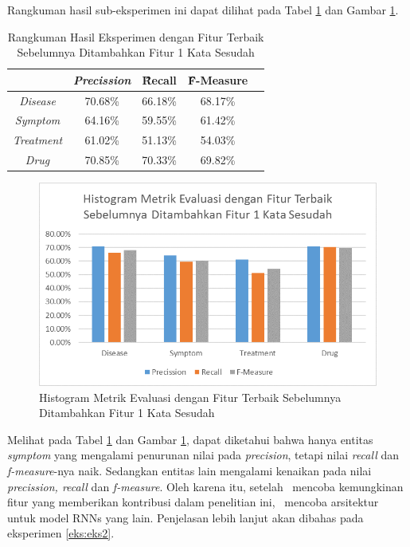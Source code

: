 	Rangkuman hasil sub-eksperimen ini dapat dilihat pada Tabel \ref{table:owndict8} dan Gambar \ref{fig:owndict8}.
	
	\begin{table}
		\centering
		\caption{Rangkuman Hasil Eksperimen dengan Fitur Terbaik Sebelumnya Ditambahkan Fitur 1 Kata Sesudah}
		\begin{tabular}{|c|c|c|c|c|}
			\hline
			& \textit{Precission} & \f{\f{Recall}} & \f{\f{F-Measure}} \\ \hline
			\textit{Disease}      & 70.68\%             & 66.18\%        & 68.17\%           \\ \hline
			\textit{Symptom}      & 64.16\%             & 59.55\%        & 61.42\%           \\ \hline
			\textit{Treatment}    & 61.02\%             & 51.13\%        & 54.03\%           \\ \hline
			\textit{Drug}		  & 70.85\%             & 70.33\%        & 69.82\%           \\ \hline
		\end{tabular}
		\label{table:owndict8}
	\end{table}
	
	\begin{figure}
		\centering
		\includegraphics[width=0.85\linewidth]{images/histogram8}
		\caption{Histogram Metrik Evaluasi dengan Fitur Terbaik Sebelumnya Ditambahkan Fitur 1 Kata Sesudah}
		\label{fig:owndict8}
	\end{figure}
	
	Melihat pada Tabel \ref{table:owndict8} dan Gambar \ref{fig:owndict8}, dapat diketahui bahwa hanya entitas \textit{symptom} yang mengalami penurunan nilai pada \textit{precision}, tetapi nilai \textit{recall} dan \textit{f-measure}-nya naik. Sedangkan entitas lain mengalami kenaikan pada nilai \textit{precission, recall} dan \textit{f-measure}. Oleh karena itu, setelah \saya~mencoba kemungkinan fitur yang memberikan kontribusi dalam penelitian ini, \saya~mencoba arsitektur untuk model RNNs yang lain. Penjelasan lebih lanjut akan dibahas pada eksperimen \ref{eks:eks2}.
	
